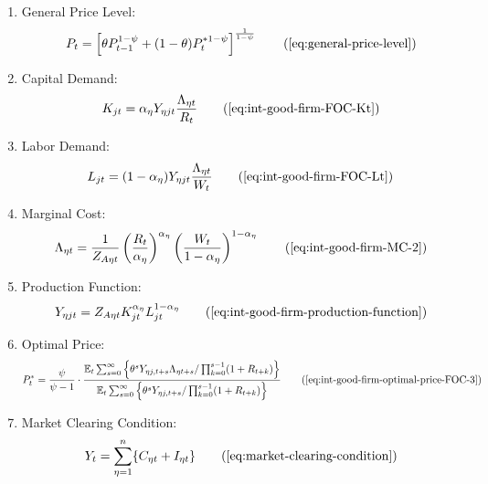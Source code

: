 \documentclass[
	12pt,
	]{article}
\numberwithin{equation}{section}
\newcommand{\E}[1][t]{{\mathbb{E}_{#1}}}
\theoremstyle{definition}
\theoremstyle{plain}
\theoremstyle{plain}
\theoremstyle{plain}
\begin{document}
{\begin{itemize}
\begin{enumerate}
			\item General Price Level:
			\begin{align}
				P_t = \left[ \theta P_{t-1}^{1-\psi} + (1-\theta) P_t^{\ast 1-\psi} \right]^\frac{1}{1-\psi}
				\tag{\ref{eq:general-price-level}}
			\end{align}
			
			\item Capital Demand:
			\begin{align}
				K_{jt} = {\alpha_\eta} Y_{\eta jt} \frac{\Lambda_{\eta t}}{R_t}
				\tag{\ref{eq:int-good-firm-FOC-Kt}}
			\end{align}
			
			\item Labor Demand:
			\begin{align}
				L_{jt} = (1-{\alpha_\eta}) Y_{\eta jt} \frac{\Lambda_{\eta t}}{W_t}
				\tag{\ref{eq:int-good-firm-FOC-Lt}}
			\end{align}
			
			
			\item Marginal Cost:
			\begin{align}
				\Lambda_{\eta t} = \frac{1}{Z_{A\eta t}} \left( \frac{R_t}{\alpha_\eta} \right)^{\alpha_\eta} \left( \frac{W_t}{1-{\alpha_\eta}} \right)^{1-{\alpha_\eta}}
				\tag{\ref{eq:int-good-firm-MC-2}}
			\end{align}
			
			\item Production Function:
			\begin{align}
				Y_{\eta jt} = Z_{A\eta t} K_{jt}^{\alpha_\eta} L_{jt}^{1-{\alpha_\eta}}
				\tag{\ref{eq:int-good-firm-production-function}}
			\end{align}
			
			\item Optimal Price:
			\begin{align}
				P_t^\ast = \frac{\psi}{\psi-1} \cdot \frac{ \E \sum_{s=0}^{\infty} \left\{ \theta^s Y_{\eta j,t+s} \Lambda_{\eta t+s} / \prod_{k=0}^{s-1}(1+R_{t+k}) \right\} } {\E \sum_{s=0}^{\infty} \left\{ \theta^s Y_{\eta j,t+s} / \prod_{k=0}^{s-1}(1 + R_{t+k}) \right\}} \tag{\ref{eq:int-good-firm-optimal-price-FOC-3}}
			\end{align}
			
			\item Market Clearing Condition:
			\begin{align}
				Y_t = \sum_{\eta = 1}^{n} \{ C_{\eta t} + I_{\eta t} \} \tag{\ref{eq:market-clearing-condition}}
			\end{align}
			

\end{enumerate}
\end{itemize}}
\end{document}
